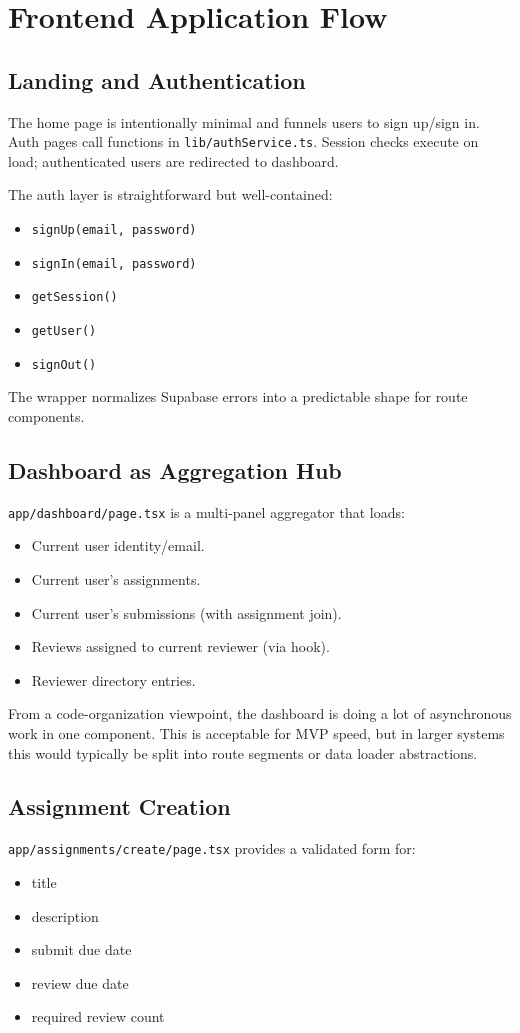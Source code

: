 \documentclass[11pt]{article}
\begin{document}
\section{Frontend Application Flow}
\subsection{Landing and Authentication}
The home page is intentionally minimal and funnels users to sign up/sign in. Auth pages call functions in \texttt{lib/authService.ts}. Session checks execute on load; authenticated users are redirected to dashboard.

The auth layer is straightforward but well-contained:
\begin{itemize}[leftmargin=*]
  \item \texttt{signUp(email, password)}
  \item \texttt{signIn(email, password)}
  \item \texttt{getSession()}
  \item \texttt{getUser()}
  \item \texttt{signOut()}
\end{itemize}
The wrapper normalizes Supabase errors into a predictable shape for route components.

\subsection{Dashboard as Aggregation Hub}
\texttt{app/dashboard/page.tsx} is a multi-panel aggregator that loads:
\begin{itemize}[leftmargin=*]
  \item Current user identity/email.
  \item Current user's assignments.
  \item Current user's submissions (with assignment join).
  \item Reviews assigned to current reviewer (via hook).
  \item Reviewer directory entries.
\end{itemize}

From a code-organization viewpoint, the dashboard is doing a lot of asynchronous work in one component. This is acceptable for MVP speed, but in larger systems this would typically be split into route segments or data loader abstractions.

\subsection{Assignment Creation}
\texttt{app/assignments/create/page.tsx} provides a validated form for:
\begin{itemize}[leftmargin=*]
  \item title
  \item description
  \item submit due date
  \item review due date
  \item required review count
\end{itemize}
\end{document}
